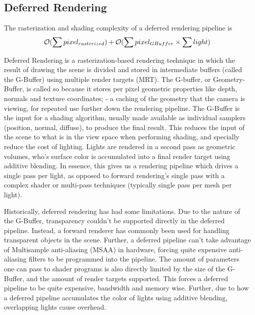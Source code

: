 \subsection{Deferred Rendering}

The rasterization and shading complexity of a deferred rendering pipeline is
\begin{equation}\label{eq:DRP_complexity}
		\mathcal{O}(\sum {pixel_{rasterized}}) + \mathcal{O}(\sum {pixel_{GBuffer}} \times \sum {light})
\end{equation}

Deferred Rendering \cite{deering1988} is a rasterization-based rendering technique in which the result of drawing the scene is divided and stored in intermediate buffers (called the G-Buffer) using multiple render targets (MRT).  The G-buffer, or Geometry-Buffer, is called so because it stores per pixel geometric properties like depth, normals and texture coordinates; - a caching of the geometry that the camera is viewing, for repeated use further down the rendering pipeline. The G-Buffer is the input for a shading algorithm, usually made available as individual samplers (position, normal, diffuse), to produce the final result. This reduces the input of the scene to what is in the view space when performing shading, and specially reduce the cost of lighting. Lights are rendered in a second pass as geometric volumes, who's surface color is accumulated into a final render target using additive blending. In essence, this gives us a rendering pipeline which drives a single pass per light, as opposed to forward rendering's single pass with a complex shader or multi-pass techniques (typically single pass per mesh per light).

Historically, deferred rendering has had some limitations. Due to the nature of the G-Buffer, transparency couldn't be supported directly in the deferred pipeline. Instead, a forward renderer has commonly been used for handling transparent objects in the scene. Further, a deferred pipeline can't take advantage of Multisample anti-aliasing (MSAA) in hardware, forcing quite expensive anti-aliasing filters to be programmed into the pipeline. The amount of parameters one can pass to shader programs is also directly limited by the size of the G-Buffer, and the amount of render targets supported. This forces a deferred pipeline to be quite expensive, bandwidth and memory wise. Further, due to how a deferred pipeline accumulates the color of lights using additive blending, overlapping lights cause overhead.

